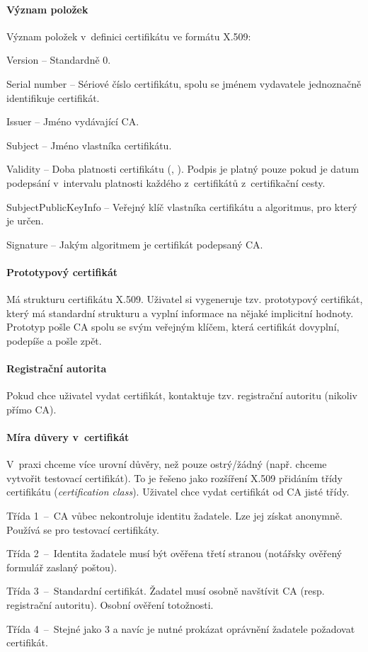 \paragraph*{Význam položek} Význam položek v~definici certifikátu ve formátu X.509: \begin{compactitem}
    \item Version -- Standardně 0.
    \item Serial number -- Sériové číslo certifikátu, spolu se jménem vydavatele jednoznačně identifikuje certifikát.
    \item Issuer -- Jméno vydávající CA.
    \item Subject -- Jméno vlastníka certifikátu.
    \item Validity -- Doba platnosti certifikátu (, ). Podpis je platný pouze pokud je datum podepsání v~intervalu platnosti každého z~certifikátů z~certifikační cesty.
    \item SubjectPublicKeyInfo -- Veřejný klíč vlastníka certifikátu a algoritmus, pro který je určen.
    \item Signature -- Jakým algoritmem je certifikát podepsaný CA.
\end{compactitem}

\paragraph*{Prototypový certifikát} Má strukturu certifikátu X.509. Uživatel si vygeneruje tzv. prototypový certifikát, který má standardní strukturu a vyplní informace na nějaké implicitní hodnoty. Prototyp pošle CA spolu se svým veřejným klíčem, která certifikát dovyplní, podepíše a pošle zpět.

\paragraph*{Registrační autorita} Pokud chce uživatel vydat certifikát, kontaktuje tzv. registrační autoritu (nikoliv přímo CA).

\paragraph*{Míra důvery v~certifikát}  V~praxi chceme více urovní důvěry, než pouze ostrý/žádný (např. chceme vytvořit testovací certifikát). To je řešeno jako rozšíření X.509 přidáním třídy certifikátu (\textit{certification class}). Uživatel chce vydat certifikát od CA jisté třídy. \begin{compactitem}
    \item Třída 1~--~CA vůbec nekontroluje identitu žadatele. Lze jej získat anonymně. Používá se pro testovací certifikáty.
    \item Třída 2~--~Identita žadatele musí být ověřena třetí stranou (notářsky ověřený formulář zaslaný poštou).
    \item Třída 3~--~Standardní certifikát. Žadatel musí osobně navštívit CA (resp. registrační autoritu). Osobní ověření totožnosti.
    \item Třída 4~--~Stejné jako 3 a navíc je nutné prokázat oprávnění žadatele požadovat certifikát.
\end{compactitem}

